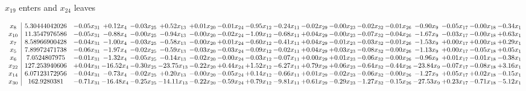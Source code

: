 \documentclass[9pt]{article}
\begin{document}
 $ x_{19} $ enters and $ x_{24} $ leaves 

 \[\begin{array}{c| c c@{\hskip 2pt} c@{\hskip 2pt} c@{\hskip 2pt} c@{\hskip 2pt} c@{\hskip 2pt} c@{\hskip 2pt} c@{\hskip 2pt} c@{\hskip 2pt} c@{\hskip 2pt} c@{\hskip 2pt} c@{\hskip 2pt} c@{\hskip 2pt} c@{\hskip 2pt} c@{\hskip 2pt} c@{\hskip 2pt} c@{\hskip 2pt} }
 x_{8}   &  5.30444042026 & -0.05 x_{31} & +  0.12 x_{4} & -0.03 x_{25} & +  0.52 x_{13} & +  0.01 x_{20} & -0.01 x_{24} & -0.95 x_{12} & -0.24 x_{11} & -0.02 x_{29} & -0.00 x_{23} & -0.02 x_{32} & -0.01 x_{26} & -0.90 x_{9} & -0.05 x_{17} & -0.00 x_{18} & -0.34 x_{1}\\
 x_{10}   &  11.3547976586 & -0.05 x_{31} & -0.88 x_{4} & -0.00 x_{25} & -0.94 x_{13} & -0.00 x_{20} & -0.02 x_{24} & -1.09 x_{12} & -0.68 x_{11} & +  0.04 x_{29} & -0.00 x_{23} & -0.07 x_{32} & -0.04 x_{26} & -1.67 x_{9} & -0.03 x_{17} & -0.00 x_{18} & +  0.63 x_{1}\\
 x_{7}   &  8.58966900428 & -0.04 x_{31} & -1.00 x_{4} & -0.03 x_{25} & -0.58 x_{13} & -0.00 x_{20} & +  0.01 x_{24} & -0.60 x_{12} & -0.41 x_{11} & +  0.04 x_{29} & -0.01 x_{23} & -0.03 x_{32} & -0.01 x_{26} & -1.53 x_{9} & +  0.00 x_{17} & +  0.00 x_{18} & +  0.29 x_{1}\\
 x_{5}   &  7.89972471738 & -0.06 x_{31} & -1.97 x_{4} & -0.02 x_{25} & -0.59 x_{13} & -0.03 x_{20} & -0.03 x_{24} & -0.09 x_{12} & -0.02 x_{11} & +  0.04 x_{29} & +  0.03 x_{23} & -0.08 x_{32} & -0.00 x_{26} & -1.13 x_{9} & +  0.00 x_{17} & -0.05 x_{18} & +  0.05 x_{1}\\
 x_{6}   &  7.0524807975 & -0.01 x_{31} & -1.32 x_{4} & -0.05 x_{25} & -0.14 x_{13} & -0.02 x_{20} & -0.00 x_{24} & -0.03 x_{12} & -0.07 x_{11} & +  0.00 x_{29} & +  0.01 x_{23} & -0.06 x_{32} & -0.00 x_{26} & -0.96 x_{9} & +  0.01 x_{17} & -0.01 x_{18} & -0.38 x_{1}\\
 x_{22}   &  127.253940606 & +  0.04 x_{31} & -16.52 x_{4} & -0.30 x_{25} & -23.75 x_{13} & -0.22 x_{20} & +  0.44 x_{24} & +  1.52 x_{12} & -6.27 x_{11} & +  0.79 x_{29} & +  0.06 x_{23} & -0.64 x_{32} & -0.44 x_{26} & -23.84 x_{9} & -0.07 x_{17} & -0.08 x_{18} & +  3.16 x_{1}\\
 x_{14}   &  6.07123172956 & -0.04 x_{31} & -0.73 x_{4} & -0.02 x_{25} & +  0.20 x_{13} & -0.00 x_{20} & -0.05 x_{24} & +  0.14 x_{12} & -0.66 x_{11} & +  0.01 x_{29} & -0.02 x_{23} & -0.06 x_{32} & -0.00 x_{26} & -1.27 x_{9} & +  0.05 x_{17} & +  0.02 x_{18} & -0.15 x_{1}\\
 x_{30}   &  162.9280381 & -0.71 x_{31} & -16.48 x_{4} & -0.25 x_{25} & -14.11 x_{13} & -0.22 x_{20} & -0.59 x_{24} & +  0.79 x_{12} & -9.81 x_{11} & +  0.61 x_{29} & -0.29 x_{23} & -1.27 x_{32} & -0.15 x_{26} & -27.53 x_{9} & +  0.23 x_{17} & -0.71 x_{18} & -5.12 x_{1}\\

\end{array}\]
\end{document}
